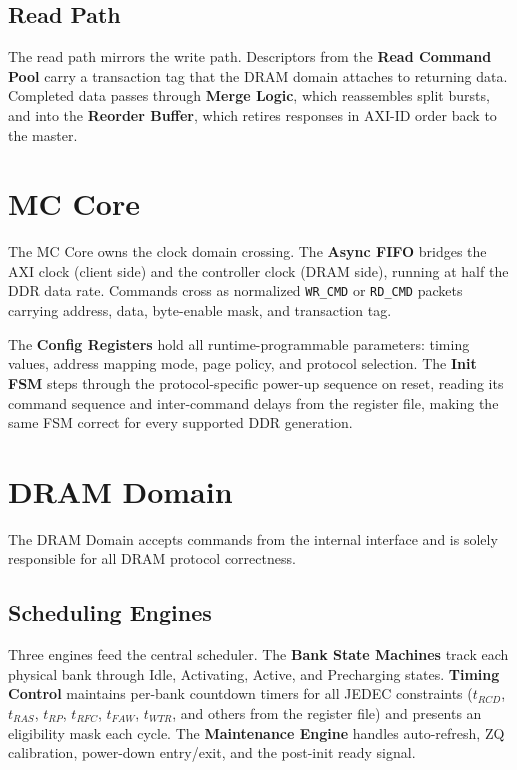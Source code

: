 \documentclass[10pt]{article}
\begin{document}
\subsection{Read Path}
The read path mirrors the write path. Descriptors from the \textbf{Read Command Pool}
carry a transaction tag that the DRAM domain attaches to returning data. Completed data
passes through \textbf{Merge Logic}, which reassembles split bursts, and into the
\textbf{Reorder Buffer}, which retires responses in AXI-ID order back to the master.

\section{MC Core}

The MC Core owns the clock domain crossing. The \textbf{Async FIFO} bridges the AXI
clock (client side) and the controller clock (DRAM side), running at half the DDR data
rate. Commands cross as normalized \texttt{WR\_CMD} or \texttt{RD\_CMD} packets carrying
address, data, byte-enable mask, and transaction tag.

The \textbf{Config Registers} hold all runtime-programmable parameters: timing values,
address mapping mode, page policy, and protocol selection. The \textbf{Init FSM} steps
through the protocol-specific power-up sequence on reset, reading its command sequence
and inter-command delays from the register file, making the same FSM correct for every
supported DDR generation.

\section{DRAM Domain}

The DRAM Domain accepts commands from the internal interface and is solely responsible
for all DRAM protocol correctness.

\subsection{Scheduling Engines}
Three engines feed the central scheduler. The \textbf{Bank State Machines} track each
physical bank through Idle, Activating, Active, and Precharging states. \textbf{Timing
Control} maintains per-bank countdown timers for all JEDEC constraints ($t_{RCD}$,
$t_{RAS}$, $t_{RP}$, $t_{RFC}$, $t_{FAW}$, $t_{WTR}$, and others from the register
file) and presents an eligibility mask each cycle. The \textbf{Maintenance Engine}
handles auto-refresh, ZQ calibration, power-down entry/exit, and the post-init ready
signal.
\end{document}
